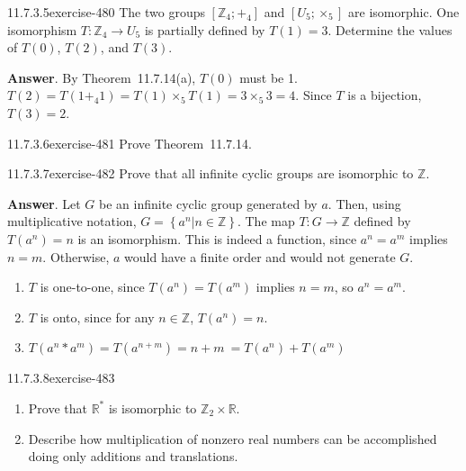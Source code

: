 \documentclass[twoside,10pt,]{book}
\numberwithin{equation}{section}
\begin{document}
\begin{divisionsolution}{11.7.3.5}{}{exercise-480}%
\hypertarget{p-4285}{}%
The two groups \(\left[\mathbb{Z}_4;+_4\right]\) and \(\left[U_5;\times _5\right]\) are isomorphic. One isomorphism \(T:\mathbb{Z}_4\to U_5\) is partially defined by \(T(1)=3\). Determine the values of \(T(0)\), \(T(2)\), and \(T(3)\).%
\par\smallskip%
\noindent\textbf{Answer}.\quad%
\hypertarget{p-4286}{}%
By Theorem~11.7.14(a), \(T(0)\) must be 1.   \(T(2)=T(1+_4 1)=T(1)\times_5 T(1) = 3 \times_5 3 = 4\).  Since \(T\) is a bijection, \(T(3)=2\).%
\end{divisionsolution}%
\begin{divisionsolution}{11.7.3.6}{}{exercise-481}%
\hypertarget{p-4287}{}%
Prove Theorem~11.7.14.%
\end{divisionsolution}%
\begin{divisionsolution}{11.7.3.7}{}{exercise-482}%
\hypertarget{p-4288}{}%
Prove that all infinite cyclic groups are isomorphic to \(\mathbb{Z}\).%
\par\smallskip%
\noindent\textbf{Answer}.\quad%
\hypertarget{p-4289}{}%
Let \(G\) be an infinite cyclic group generated by \(a\). Then, using multiplicative notation,  \(G=\left\{\left.a^n\right| n\in \mathbb{Z}\right\}\).  The map \(T: G \rightarrow \mathbb{Z}\) defined by \(T\left(a^n\right)=n\) is an isomorphism. This is indeed a function, since \(a^n=a^m\) implies \(n =m\). Otherwise, \(a\) would have a finite order and would not generate \(G\).%
\par
\hypertarget{p-4290}{}%
\leavevmode%
\begin{enumerate}[label=(\alph*)]
\item\hypertarget{li-1964}{}\hypertarget{p-4291}{}%
\(T\) is one-to-one, since \(T\left(a^n\right) = T\left(a^m\right)\) implies \(n = m\), so \(a^n= a^m\).%
\item\hypertarget{li-1965}{}\hypertarget{p-4292}{}%
\(T\) is onto, since for any \(n\in \mathbb{Z}\), \(T\left(a^n\right) = n\).%
\item\hypertarget{li-1966}{}\hypertarget{p-4293}{}%
\(T\left(a^n*a^m \right) = T\left(a^{n+m}\right) =n + m\ =T\left(a^n\right)+T\left(a^m\right)\)%
\end{enumerate}
%
\end{divisionsolution}%
\begin{divisionsolution}{11.7.3.8}{}{exercise-483}%
\hypertarget{p-4294}{}%
\leavevmode%
\begin{enumerate}[label=(\alph*)]
\item\hypertarget{li-1967}{}\hypertarget{p-4295}{}%
Prove that \(\mathbb{R}^*\) is isomorphic to \(\mathbb{Z}_2 \times  \mathbb{R}\).%
\item\hypertarget{li-1968}{}\hypertarget{p-4296}{}%
Describe how multiplication of nonzero real numbers can be accomplished doing only additions and translations.%
\end{enumerate}
%
\end{divisionsolution}%
\end{document}
